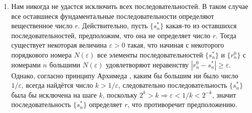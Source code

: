 \documentclass[12pt]{article}
\begin{document}
\begin{enumerate}
    \item Нам никогда не удастся исключить всех последовательностей. В таком случае все оставшиеся фундаментальные последовательности определяют вещественное число $r$. Действительно, пусть $\{s^*_n\}$ какая-то из оставшихся последовательностей, предположим, что она не определяет число $r$. Тогда существует некоторая величина $\varepsilon > 0$ такая, что начиная с некоторого порядкового номера $N(\varepsilon)$ все элементы последовательностей $\{s^*_n\}$ и $\{r^0_n\}$ с номерами $n$ большими $N(\varepsilon)$ удовлетворяют неравенству $|r^0_n - s^*_n| \geq \varepsilon$. Однако, согласно принципу Архимеда \cite{matan-archimed}, каким бы большим ни было число $1/\varepsilon$, всегда найдётся число $k > 1/\varepsilon$, следовательно последовательность $\{s^*_n\}$ была бы исключена на шаге $k$, поскольку $2^{k} > k \Rightarrow \varepsilon < 1/k < 2^{-k}$, значит последовательность $\{s^*_n\}$ определяет $r$, что противоречит предположению.

\end{enumerate}
\end{document}
